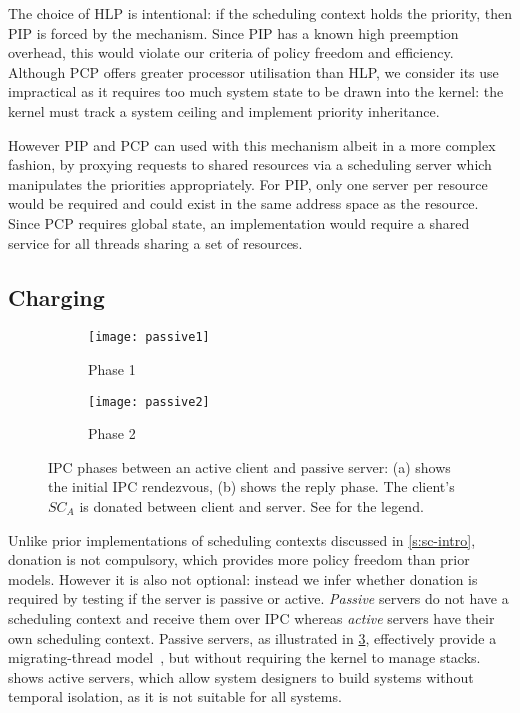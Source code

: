 The choice of \gls{HLP} is intentional: if the scheduling context holds the priority, then \gls{PIP}
is forced by the mechanism. Since \gls{PIP} has a known high preemption overhead, this would violate
our criteria of policy freedom and efficiency.  
Although \gls{PCP} offers greater processor utilisation than \gls{HLP}, we consider its use impractical as it requires too much system state to be drawn into the kernel: the kernel must track a system ceiling and implement priority inheritance.

However \gls{PIP} and \gls{PCP} can used with this mechanism albeit in a more complex fashion, by
proxying requests to shared resources via a scheduling server which manipulates the priorities
appropriately. For \gls{PIP}, only one server per resource would be required and could exist in the
same address space as the resource. Since \gls{PCP} requires global state, an implementation would
require a shared service for all threads sharing a set of resources.

\subsection{Charging}

\begin{figure}
    \centering
    \begin{subfigure}[h]{0.48\textwidth}
        \centering
        \texttt{[image: passive1]}
        \caption{Phase 1}
        \label{f:ipc1}
    \end{subfigure}%
    \begin{subfigure}[h]{0.48\textwidth}
        \centering
        \texttt{[image: passive2]}
        \caption{Phase 2}
        \label{f:ipc2}
    \end{subfigure}
    \label{f:passive}
    \caption{IPC phases between an active client and passive server: (a) shows the initial IPC rendezvous, (b) shows the
    reply phase. The client's $SC_{A}$ is donated between client and server. See  for the legend.}
\end{figure}


Unlike prior implementations of scheduling contexts discussed in \cref{s:sc-intro},
donation is not compulsory, which provides more policy freedom than prior models.
However it is also not optional: instead we infer whether donation is required by testing 
if the server is passive or active. \emph{Passive} servers do not have a scheduling context 
and receive them over \gls{IPC} whereas \emph{active} servers have their own scheduling context. 
Passive servers, as illustrated in \cref{f:passive}, effectively provide a migrating-thread
model~\citep{Ford_Lepreau_94, Gabber_SBBS_99}, but without requiring
the kernel to manage stacks.  shows active servers, which allow system designers to
build systems without temporal isolation, as it is not suitable
for all systems.

